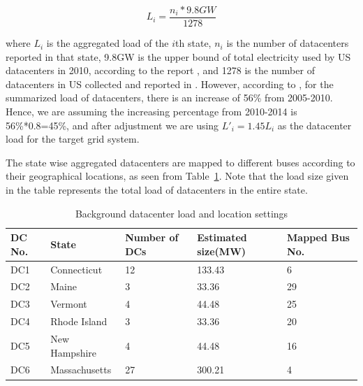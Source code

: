 \begin{itemize}
{\begin{equation}
L_i=\frac{n_i*9.8GW}{1278}
\end{equation}

\noindent where $L_i$ is the aggregated load of the $i$th state, $n_i$ is the number of datacenters reported in that state,  9.8GW is the upper bound of total electricity used by US datacenters in 2010, according to the report \cite{Koomey2011}, and 1278 is the number of datacenters in US collected and reported in \cite{DCmap}. However, according to \cite{Koomey2011}, for the summarized load of datacenters, there is an increase of 56\% from 2005-2010. Hence, we are assuming the increasing percentage from 2010-2014 is 56\%*0.8=45\%, and after adjustment we are using $L'_i=1.45L_i$ as the datacenter load for the target grid system.

The state wise aggregated datacenters are mapped to different buses according to their geographical locations, as seen from Table~\ref{tab:dc_setting}. Note that the load size given in the table represents the total load of datacenters in the entire state.

\begin{table}[ht]
\begin{center}
\caption{Background datacenter load and location settings}
\begin{tabular}{|l|l|p{30pt}|p{30pt}|p{30pt}|}
\hline
DC No. & State & Number of DCs & Estimated size(MW) & Mapped Bus No.\\
\hline
DC1 & Connecticut & 12 &133.43 & 6\\
DC2 & Maine & 3 &33.36 & 29 \\
DC3 & Vermont & 4 &44.48 & 25 \\
DC4 & Rhode Island & 3 &33.36 & 20\\
DC5 & New Hampshire & 4& 44.48 & 16\\
DC6 & Massachusetts & 27& 300.21 & 4 \\
\hline

\end{tabular}
   \vspace{.05in}
\label{tab:dc_setting}
\end{center}
\end{table}
}


\end{itemize}
